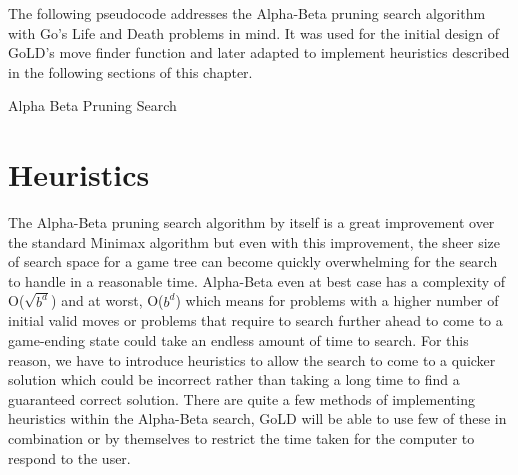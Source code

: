 \documentclass{l4proj}
\begin{document}
The following pseudocode addresses the Alpha-Beta pruning search algorithm with Go's Life and Death problems in mind. It was used for the initial design of GoLD's move finder function and later adapted to implement heuristics described in the following sections of this chapter.

\begin{algorithm}[H]
\caption{Alpha Beta Pruning Search}\label{Alpha-Beta}
    \DontPrintSemicolon
\end{algorithm}





\section{Heuristics}

The Alpha-Beta pruning search algorithm by itself is a great improvement over the standard Minimax algorithm but even with this improvement, the sheer size of search space for a game tree can become quickly overwhelming for the search to handle in a reasonable time. Alpha-Beta even at best case has a complexity of O($\sqrt{b^d}$) and at worst, O($b^d$) which means for problems with a higher number of initial valid moves or problems that require to search further ahead to come to a game-ending state could take an endless amount of time to search. For this reason, we have to introduce heuristics to allow the search to come to a quicker solution which could be incorrect rather than taking a long time to find a guaranteed correct solution. There are quite a few methods of implementing heuristics within the Alpha-Beta search, GoLD will be able to use few of these in combination or by themselves to restrict the time taken for the computer to respond to the user.
\end{document}
